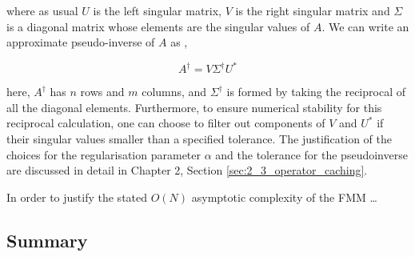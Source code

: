 where as usual $U$ is the left singular matrix, $V$ is the right singular matrix
and $\Sigma$ is a diagonal matrix whose elements are the singular values of $A$.
We can write an approximate pseudo-inverse of $A$ as \cite{Trefethen:1997:SIAM},

\begin{equation}
    A^\dagger = V \Sigma^\dagger U^*
\end{equation}

here, $A^\dagger$ has $n$ rows and $m$ columns, and $\Sigma^\dagger$ is formed
by taking the reciprocal of all the diagonal elements. Furthermore, to ensure
numerical stability for this reciprocal calculation, one can choose to filter
out components of $V$ and $U^*$ if their singular values smaller than a specified
tolerance. The justification of the choices for the regularisation parameter
$\alpha$ and the tolerance for the pseudoinverse are discussed in detail in
Chapter 2, Section \ref{sec:2_3_operator_caching}.

In order to justify the stated $O(N)$ asymptotic complexity of the FMM \dots

\subsection{Summary}

